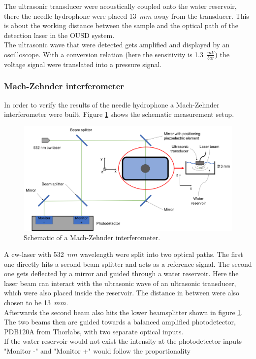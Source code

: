 The ultrasonic transducer were acoustically coupled onto the water reservoir, there the needle hydrophone were placed 13~$mm$ away from the transducer. This is about the working distance between the sample and the optical path of the detection laser in the OUSD system. \\
The ultrasonic wave that were detected gets amplified and displayed by an oscilloscope. With a conversion relation (here the sensitivity is 1.3~$\frac{mV}{bar}$) the voltage signal were translated into a pressure signal.  


\subsubsection{Mach-Zehnder interferometer}

In order to verify the results of the needle hydrophone a Mach-Zehnder interferometer were built. Figure \ref{fig:MZinterSchem} shows the schematic measurement setup.  

\begin{figure}[H]
	\centering
	\includegraphics[height=0.4\textheight]{05_OUSD/images/MZinterSchem.png}
	\caption{Schematic of a Mach-Zehnder interferometer.}
	\label{fig:MZinterSchem}
\end{figure} 

A cw-laser with 532~$nm$ wavelength were split into two optical paths. The first one directly hits a second beam splitter and acts as a reference signal. The second one gets deflected by a mirror and guided through a water reservoir. Here the laser beam can interact with the ultrasonic wave of an ultrasonic transducer, which were also placed inside the reservoir. The distance in between were also chosen to be 13~$mm$. \\
Afterwards the second beam also hits the lower beamsplitter shown in figure \ref{fig:MZinterSchem}. The two beams then are guided towards a balanced amplified photodetector, PDB120A from Thorlabs, with two separate optical inputs.\\
If the water reservoir would not exist the intensity at the photodetector inputs "Monitor -" and "Monitor +" would follow the proportionality

